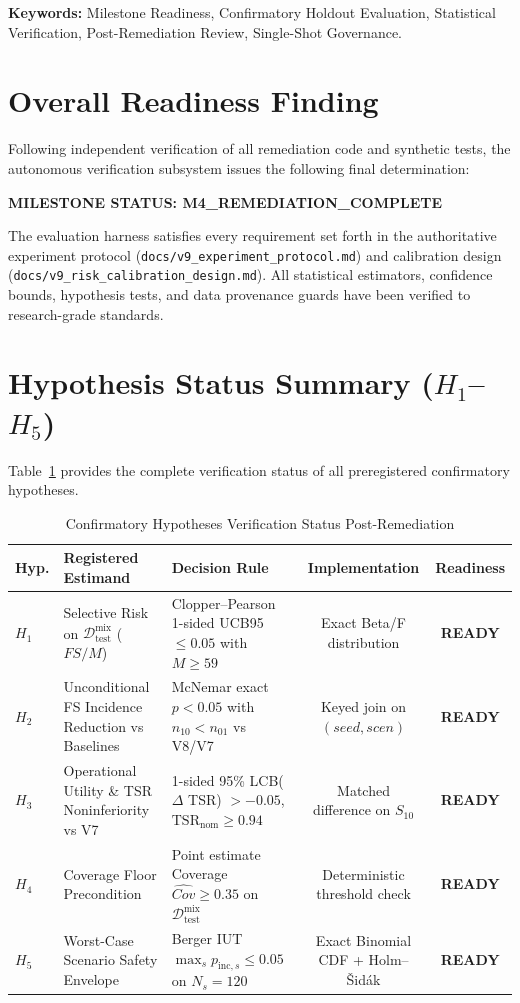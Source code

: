 \documentclass[10pt,a4paper]{article}
\begin{document}
\vspace{6pt}
\noindent \textbf{Keywords:} Milestone Readiness, Confirmatory Holdout Evaluation, Statistical Verification, Post-Remediation Review, Single-Shot Governance.

\section{Overall Readiness Finding}
Following independent verification of all remediation code and synthetic tests, the autonomous verification subsystem issues the following final determination:
\begin{center}
\large \textbf{MILESTONE STATUS: M4\_REMEDIATION\_COMPLETE}
\end{center}
The evaluation harness satisfies every requirement set forth in the authoritative experiment protocol (\texttt{docs/v9\_experiment\_protocol.md}) and calibration design (\texttt{docs/v9\_risk\_calibration\_design.md}). All statistical estimators, confidence bounds, hypothesis tests, and data provenance guards have been verified to research-grade standards.

\section{Hypothesis Status Summary ($H_1$--$H_5$)}
Table~\ref{tab:hypotheses_status} provides the complete verification status of all preregistered confirmatory hypotheses.

\begin{table}[htbp]
\centering
\small
\caption{Confirmatory Hypotheses Verification Status Post-Remediation}
\label{tab:hypotheses_status}
\begin{tabularx}{\textwidth}{lXp{4.2cm}cc}
\toprule
\textbf{Hyp.} & \textbf{Registered Estimand} & \textbf{Decision Rule} & \textbf{Implementation} & \textbf{Readiness} \\
\midrule
$H_1$ & Selective Risk on $\mathcal{D}_{\mathrm{test}}^{\mathrm{mix}}$ ($FS / M$) & Clopper--Pearson 1-sided UCB95 $\le 0.05$ with $M \ge 59$ & Exact Beta/F distribution & \textbf{READY} \\
$H_2$ & Unconditional FS Incidence Reduction vs Baselines & McNemar exact $p < 0.05$ with $n_{10} < n_{01}$ vs V8/V7 & Keyed join on $(seed, scen)$ & \textbf{READY} \\
$H_3$ & Operational Utility \& TSR Noninferiority vs V7 & 1-sided 95\% LCB($\Delta$ TSR) $> -0.05$, $\text{TSR}_{\mathrm{nom}} \ge 0.94$ & Matched difference on $S_{10}$ & \textbf{READY} \\
$H_4$ & Coverage Floor Precondition & Point estimate Coverage $\widehat{Cov} \ge 0.35$ on $\mathcal{D}_{\mathrm{test}}^{\mathrm{mix}}$ & Deterministic threshold check & \textbf{READY} \\
$H_5$ & Worst-Case Scenario Safety Envelope & Berger IUT $\max_s p_{\mathrm{inc}, s} \le 0.05$ on $N_s = 120$ & Exact Binomial CDF + Holm--Šidák & \textbf{READY} \\
\bottomrule
\end{tabularx}
\end{table}
\end{document}
